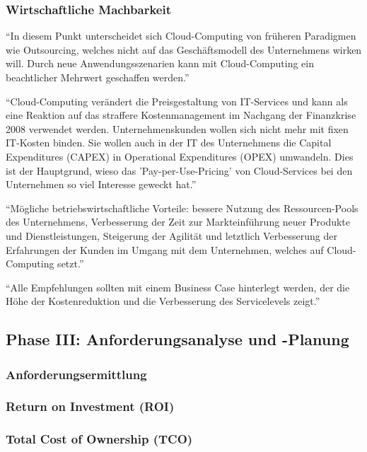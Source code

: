 \subsubsection{Wirtschaftliche Machbarkeit}
"`In diesem Punkt unterscheidet sich Cloud-Computing von früheren Paradigmen
wie Outsourcing, welches nicht auf das Geschäftsmodell des Unternehmens wirken
will. Durch neue Anwendungsszenarien kann mit Cloud-Computing ein beachtlicher
Mehrwert geschaffen werden."' 

"`Cloud-Computing verändert die Preisgestaltung von IT-Services und kann als
eine Reaktion  auf das straffere Kostenmanagement im Nachgang der Finanzkrise
2008 verwendet werden. Unternehmenskunden wollen sich nicht mehr mit fixen
IT-Kosten binden. Sie wollen auch in der IT des Unternehmens die Capital
Expenditures (CAPEX) in Operational Expenditures (OPEX) umwandeln. Dies ist der
Hauptgrund, wieso das 'Pay-per-Use-Pricing' von Cloud-Services bei den
 Unternehmen so viel Interesse geweckt hat."' 


"`Mögliche betriebswirtschaftliche Vorteile: bessere Nutzung des
Ressourcen-Pools des Unternehmens, Verbesserung der Zeit zur Markteinführung
neuer Produkte und Dienstleistungen, Steigerung der Agilität und letztlich
Verbesserung der Erfahrungen der Kunden im Umgang mit dem Unternehmen,
welches auf Cloud-Computing setzt."'


"`Alle Empfehlungen sollten mit einem Business Case hinterlegt werden, der
die Höhe der Kostenreduktion und die Verbesserung des Servicelevels zeigt."'

\subsection{Phase III: Anforderungsanalyse und -Planung}
\subsubsection{Anforderungsermittlung}
\subsubsection{Return on Investment (ROI)}
\subsubsection{Total Cost of Ownership (TCO)}

